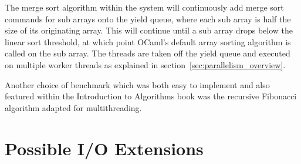 \documentclass[12pt,twoside,notitlepage]{report}
\begin{document}
The merge sort algorithm within the system will continuously add merge sort commands for sub arrays onto the yield queue, where each sub array is half the size of its originating array. This will continue until a sub array
drops below the linear sort threshold, at which point OCaml's default array sorting algorithm is called on the sub array. The threads are taken off the yield queue and executed on multiple worker threads as explained in
section~\ref{sec:parallelism_overview}.

%
%
Another choice of benchmark which was both easy to implement and also featured within the Introduction to Algorithms book was the recursive Fibonacci algorithm adapted for multithreading.

%
%

\section{Possible I/O Extensions}
\label{sec:possible_io_extensions}
%
%

%
%

%
%

%
%

%
%

%
%
\end{document}
